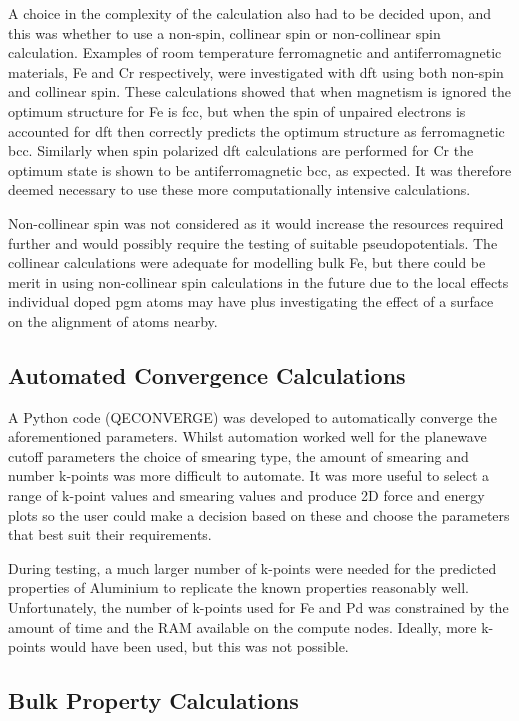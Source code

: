 A choice in the complexity of the calculation also had to be decided upon, and this was whether to use a non-spin, collinear spin or non-collinear spin calculation.  Examples of room temperature ferromagnetic and antiferromagnetic materials, Fe and Cr respectively, were investigated with \acrshort{dft} using both non-spin and collinear spin.  These calculations showed that when magnetism is ignored the optimum structure for Fe is \acrshort{fcc}, but when the spin of unpaired electrons is accounted for \acrshort{dft} then correctly predicts the optimum structure as ferromagnetic \acrshort{bcc}.  Similarly when spin polarized \acrshort{dft} calculations are performed for Cr the optimum state is shown to be antiferromagnetic \acrshort{bcc}, as expected.  It was therefore deemed necessary to use these more computationally intensive calculations.

Non-collinear spin was not considered as it would increase the resources required further and would possibly require the testing of suitable pseudopotentials.  The collinear calculations were adequate for modelling bulk \Gls{Fe}, but there could be merit in using non-collinear spin calculations in the future due to the local effects individual doped \acrshort{pgm} atoms may have plus investigating the effect of a surface on the alignment of atoms nearby.


\subsection{Automated Convergence Calculations}

A Python code (QECONVERGE) was developed to automatically converge the aforementioned parameters.  Whilst automation worked well for the planewave cutoff parameters the choice of smearing type, the amount of smearing and number k-points was more difficult to automate.  It was more useful to select a range of k-point values and smearing values and produce 2D force and energy plots so the user could make a decision based on these and choose the parameters that best suit their requirements.

During testing, a much larger number of k-points were needed for the predicted properties of Aluminium to replicate the known properties reasonably well.  Unfortunately, the number of k-points used for Fe and Pd was constrained by the amount of time and the RAM available on the compute nodes.  Ideally, more k-points would have been used, but this was not possible.


\subsection{Bulk Property Calculations}

